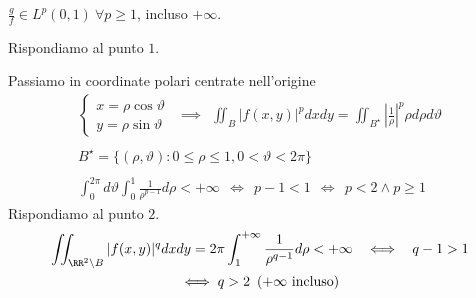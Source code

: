 $\frac{g}{f} \in L^{p}(0, 1) \ \forall p \geq 1$, incluso $ + \infty $.

\Soluzione

Rispondiamo al punto $1$.

Passiamo in coordinate polari centrate nell'origine
\begin{gather*}
\begin{cases}
x = \rho \cos \vartheta \\
y = \rho \sin \vartheta
\end{cases} \ \ \implies \ \ \iint_{B}| f(x, y)|^{p} dxdy = \iint_{B^{\star}}\left| \frac{1}{\rho}\right|^{p} \rho d\rho d\vartheta \\
\\
B^{\star} = \{(\rho, \vartheta) :0 \leq \rho \leq 1, 0 < \vartheta < 2\pi \}\\
\\
\int^{2\pi}_{0} d\vartheta \int^{1}_{0}\frac{1}{\rho^{p - 1}} d\rho < + \infty \ \ \iff \ \ p - 1 < 1\ \ \iff \ \ p < 2\land p \geq 1
\end{gather*}
Rispondiamo al punto $2$.
\begin{gather*}
\iint_{\RR^{2} \setminus B}| f(x, y)|^{q} dxdy = 2\pi \int^{+ \infty}_{1}\frac{1}{\rho^{q - 1}} d\rho < + \infty \ \ \iff \ \ q - 1 > 1\\
\iff q > 2\ \left(+ \infty \ \text{incluso}\right)
\end{gather*}

\Soluzione

